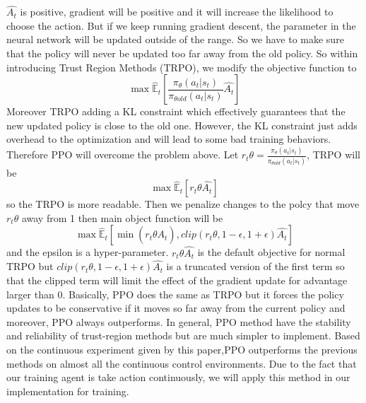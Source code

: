 \documentclass[journal,onecolumn]{IEEEtran}
\begin{document}
$\hat{A_t}$ is positive, gradient will be positive and it will increase the likelihood to choose the action. But if we keep running gradient descent, the parameter in the neural network will be updated outside of the range. So we have to make sure that the policy will never be updated too far away from the old policy. So within introducing Trust Region Methods (TRPO), we modify the objective function to $$ \max\hat{\mathbb{E}}_{t}[\frac{\pi_{\theta}(a_{t}|s_{t})}{\pi_{\theta old}(a_{t}|s_{t})}\hat{A_t}] $$Moreover TRPO adding a KL constraint  which effectively guarantees that the new updated policy is close to the old one. However, the KL constraint just adds overhead to the optimization and will lead to some bad training behaviors. Therefore PPO will overcome the problem above.  Let  $r_{t}\theta = \frac{\pi_{\theta}(a_{t}|s_{t})}{\pi_{\theta old}(a_{t}|s_{t})}$, TRPO will be $$ \max\hat{\mathbb{E}}_{t}[r_{t}\theta \hat{A_t}] $$ so the TRPO is more readable. Then we penalize changes to the polcy that move $r_{t}\theta$ away from 1 then main object function will be $$ \max \hat{\mathbb{E}}_{t} [\min(r_{t}\theta \hat{A_t}), clip(r_{t}\theta,1-\epsilon,1+\epsilon)\hat{A_t}]$$ and the epsilon is a hyper-parameter. $r_{t}\theta \hat{A_t}$ is the default objective for normal TRPO but $clip(r_{t}\theta,1-\epsilon,1+\epsilon)\hat{A_t}$ is a truncated version of the first term so that the clipped term will limit the effect of the gradient update for advantage larger than 0. Basically, PPO does the same as TRPO but it forces the policy updates to be conservative if it moves so far away from the current policy and moreover, PPO always outperforms. In general, PPO method have the stability and reliability of trust-region methods but are much simpler to implement. Based on the continuous experiment given by this paper,PPO outperforms the previous methods on almost all the continuous control environments. Due to the fact that our training agent is take action continuously, we will apply this method in our implementation for training.
\end{document}
